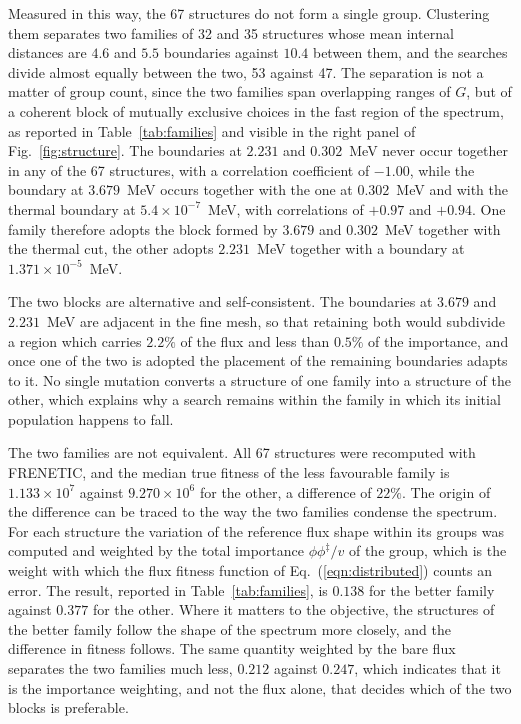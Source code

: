 \documentclass{style/nseJournal}
\begin{document}
Measured in this way, the 67 structures do not form a single group. Clustering
them separates two families of 32 and 35 structures whose mean internal
distances are $4.6$ and $5.5$ boundaries against $10.4$ between them, and the
searches divide almost equally between the two, 53 against 47. The separation is
not a matter of group count,
since the two families span overlapping ranges of $G$, but of a coherent block
of mutually exclusive choices in the fast region of the spectrum, as reported in
Table~\ref{tab:families} and visible in the right panel of
Fig.~\ref{fig:structure}. The boundaries at $2.231$ and $0.302$~MeV never occur
together in any of the 67 structures, with a correlation coefficient of $-1.00$,
while the boundary at $3.679$~MeV occurs together with the one at $0.302$~MeV
and with the thermal boundary at $5.4\times10^{-7}$~MeV, with correlations of
$+0.97$ and $+0.94$. One family therefore adopts the block formed by $3.679$ and
$0.302$~MeV together with the thermal cut, the other adopts $2.231$~MeV together
with a boundary at $1.371\times10^{-5}$~MeV.

The two blocks are alternative and self-consistent. The boundaries at $3.679$
and $2.231$~MeV are adjacent in the fine mesh, so that retaining both would
subdivide a region which carries $2.2\%$ of the flux and less than $0.5\%$ of the
importance, and once one of the two is adopted the placement of the remaining
boundaries adapts to it. No single mutation
converts a structure of one family into a structure of the other, which explains
why a search remains within the family in which its initial population happens
to fall.

The two families are not equivalent. All 67 structures were recomputed with
FRENETIC, and the median true fitness of the less favourable family is
$1.133\times10^{7}$ against $9.270\times10^{6}$ for the other, a difference of
$22\%$. The origin of the difference can be traced to the way the two families
condense the spectrum. For each structure the variation of the reference flux
shape within its groups was computed and weighted by the total importance
$\phi\phi^{\ddagger}/v$ of the group, which is the weight with which the flux
fitness function of Eq.~(\ref{eqn:distributed}) counts an error. The result,
reported in Table~\ref{tab:families}, is $0.138$ for the better family against
$0.377$ for the other. Where it matters to the objective, the structures of the
better family follow the shape of the spectrum more closely, and the difference
in fitness follows. The same quantity weighted by the bare flux separates the
two families much less, $0.212$ against $0.247$, which indicates that it is the
importance weighting, and not the flux alone, that decides which of the two
blocks is preferable.
\end{document}
